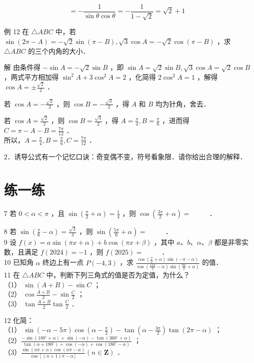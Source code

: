 \documentclass[10pt]{article}
\begin{document}
\[
=-\frac{1}{\sin \theta \cos \theta}=-\frac{1}{1-\sqrt{2}}=\sqrt{2}+1
\]

例 12 在 \(\triangle A B C\) 中，若 \(\sin (2 \pi-A)=-\sqrt{2} \sin (\pi-B), \sqrt{3} \cos A=-\sqrt{2} \cos (\pi-B)\) ，求 \(\triangle A B C\) 的三个内角的大小．

解 由条件得 \(-\sin A=-\sqrt{2} \sin B\) ，即 \(\sin A=\sqrt{2} \sin B, \sqrt{3} \cos A=\sqrt{2} \cos B\) ，两式平方相加得 \(\sin ^{2} A+3 \cos ^{2} A=2\) ，化简得 \(2 \cos ^{2} A=1\) ，解得 \(\cos A= \pm \frac{\sqrt{2}}{2}\) ．

若 \(\cos A=-\frac{\sqrt{2}}{2}\) ，则 \(\cos B=-\frac{\sqrt{3}}{2}\) ，得 \(A\) 和 \(B\) 均为针角，舍去．

若 \(\cos A=\frac{\sqrt{2}}{2}\) ，则 \(\cos B=\frac{\sqrt{3}}{2}\) ，得 \(A=\frac{\pi}{4}, B=\frac{\pi}{6}\) ，进而得 \(C=\pi-A-B=\frac{7 \pi}{12}\) ．\\
所以，\(A=\frac{\pi}{4}, B=\frac{\pi}{6}, C=\frac{7 \pi}{12}\) ．

2．诱导公式有一个记忆口诀：奇变偶不变，符号看象限．请你给出合理的解释．

\section*{练一练}
7 若 \(0<\alpha<\pi\) ，且 \(\sin \left(\frac{\pi}{2}+\alpha\right)=\frac{1}{4}\) ，则 \(\cos \left(\frac{3 \pi}{2}+\alpha\right)=\) \(\qquad\) ．

8 若 \(\sin \left(\frac{\pi}{6}-\alpha\right)=\frac{\sqrt{3}}{3}\) ，则 \(\sin \left(\frac{5 \pi}{6}+\alpha\right)=\) \(\qquad\) ．\\
9 设 \(f(x)=a \sin (\pi x+\alpha)+b \cos (\pi x+\beta)\) ，其中 \(a 、 b 、 \alpha 、 \beta\) 都是非零实数，且满足 \(f(2024)=-1\) ，则 \(f(2025)=\) \(\qquad\) ．\\
10 已知角 \(\alpha\) 终边上有一点 \(P(-4,3)\) ，求 \(\frac{\cos \left(\frac{\pi}{2}+\alpha\right) \sin (-\pi-\alpha)}{\cos \left(\frac{11 \pi}{2}-\alpha\right) \sin \left(\frac{9 \pi}{2}+\alpha\right)}\) 的值．\\
11 在 \(\triangle A B C\) 中，判断下列三角式的值是否为定值，为什么？\\
（1） \(\sin (A+B)-\sin C\) ；\\
（2） \(\cos \frac{A+B}{2}-\sin \frac{C}{2}\) ；\\
（3） \(\tan \frac{A+B}{2} \tan \frac{C}{2}\) ．

12 化简：\\
（1） \(\sin (-\alpha-5 \pi) \cos \left(\alpha-\frac{\pi}{2}\right)-\tan \left(\alpha-\frac{3 \pi}{2}\right) \tan (2 \pi-\alpha)\) ；\\
（2）\(\frac{-\sin \left(180^{\circ}+\alpha\right)+\sin (-\alpha)-\tan \left(360^{\circ}+\alpha\right)}{\tan \left(\alpha+180^{\circ}\right)+\cos (-\alpha)+\cos \left(180^{\circ}-\alpha\right)}\) ；\\
（3）\(\frac{\sin (n \pi+\alpha) \cos (n \pi-\alpha)}{\cos [(n+1) \pi-\alpha]}(n \in \mathbf{Z})\) ．
\end{document}
